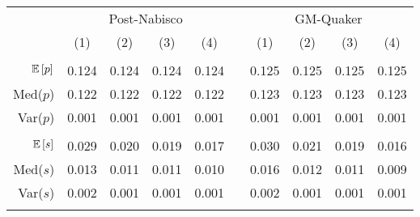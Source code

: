 \begin{tabular}{r|ccccccccc}
 & \multicolumn{4}{c}{Post-Nabisco} & & \multicolumn{4}{c}{GM-Quaker} \\ 
 & (1) & (2) & (3) & (4) && (1) & (2) & (3) & (4) \\\hline&&&&&&&&&\\ 
$\mathbb{E}\left[p\right]$ & 0.124 & 0.124  & 0.124  & 0.124&& 0.125 & 0.125  & 0.125  & 0.125 \\ 
Med($p$)& 0.122 & 0.122 & 0.122 & 0.122&& 0.123 & 0.123  & 0.123  & 0.123 \\ 
Var($p$)& 0.001 & 0.001 & 0.001 & 0.001&& 0.001 & 0.001  & 0.001  & 0.001 \\
 &&&&&&&&&\\ 
$\mathbb{E}\left[s\right]$ & 0.029 & 0.020  & 0.019  & 0.017&& 0.030 & 0.021  & 0.019  & 0.016 \\ 
Med($s$)& 0.013 & 0.011 & 0.011 & 0.010&& 0.016 & 0.012  & 0.011  & 0.009 \\ 
Var($s$)& 0.002 & 0.001 & 0.001 & 0.001&& 0.002 & 0.001  & 0.001  & 0.001 \\
 &&&&&&&&&\\ 
\end{tabular}